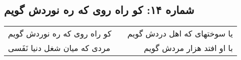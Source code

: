 \begin{center}
\section*{شماره ۱۴: کو راه روی که ره نوردش گویم}
\label{sec:014}
\begin{longtable}{l p{0.5cm} r}
کو راه روی که ره نوردش گویم
&&
یا سوختهای که اهل دردش گویم
\\
مردی که میان شغل دنیا نَفَسی
&&
با او افتد هزار مردش گویم
\\
\end{longtable}
\end{center}
